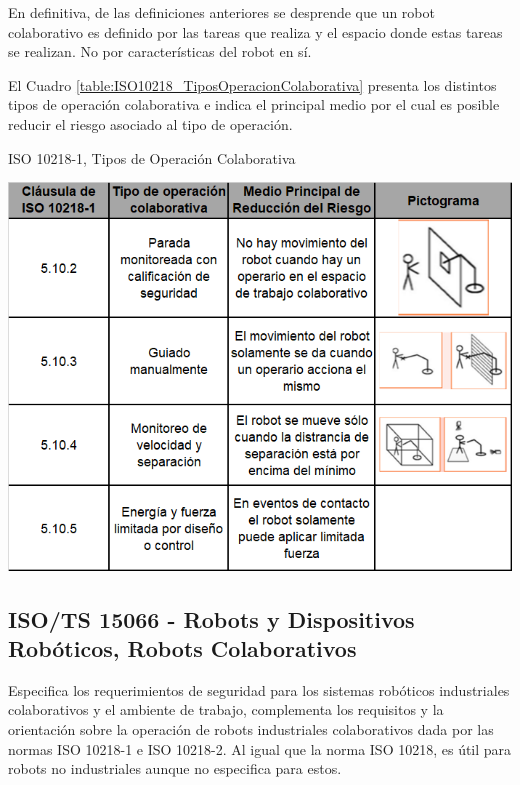 \documentclass[withindex,glossary]{cam-thesis}
\begin{document}
En definitiva, de las definiciones anteriores se desprende que un robot colaborativo es definido por las tareas que realiza y el espacio donde estas tareas se realizan. No por características del robot en sí.

El Cuadro \ref{table:ISO10218_TiposOperacionColaborativa} presenta los distintos tipos de operación colaborativa e indica el principal medio por el cual es posible reducir el riesgo asociado al tipo de operación.
\begin{table}[H]
  \centering
  \begin{minipage}[b]{\textwidth}
  	\caption[ISO 10218-1, Tipos de Operación Colaborativa]{ISO 10218-1, Tipos de Operación Colaborativa}
  	\includegraphics[width=\textwidth]{images/ISO10218_TiposOperacionColaborativa}  
  	\label{table:ISO10218_TiposOperacionColaborativa}
  \end{minipage}
\end{table}

\subsection{ISO/TS 15066 - Robots y Dispositivos Robóticos, Robots Colaborativos}
Especifica los requerimientos de seguridad para los sistemas robóticos industriales colaborativos y el ambiente de trabajo, complementa los requisitos y la orientación sobre la operación de robots industriales colaborativos dada por las normas ISO 10218-1 e ISO 10218-2. Al igual que la norma ISO 10218, es útil para robots no industriales aunque no especifica para estos.
\end{document}
